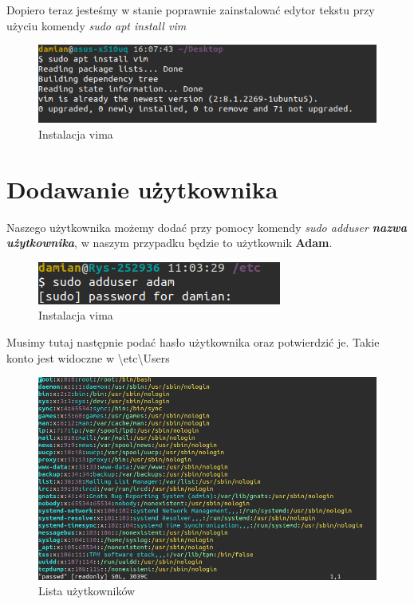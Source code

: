 \documentclass{article}
\begin{document}
Dopiero teraz jesteśmy w stanie poprawnie zainstalować edytor
tekstu przy użyciu komendy \textit{sudo apt install vim}

\begin{figure}[H]
    \centering
    
    \includegraphics[totalheight=3cm]{data/installVim.png}
    \caption{Instalacja vima}
    \label{2}
\end{figure}


\section{Dodawanie użytkownika}
Naszego użytkownika możemy dodać przy pomocy komendy 
\textit{sudo adduser \textbf{nazwa użytkownika}}, w naszym przypadku będzie to 
użytkownik \textbf{Adam}.

\begin{figure}[H]
    \centering
    \includegraphics[totalheight=2cm]{data/userAdd.png}
    \caption{Instalacja vima}
    \label{2}
\end{figure}
Musimy tutaj następnie podać hasło użytkownika oraz potwierdzić je.
Takie konto jest widoczne w  \textbackslash etc\textbackslash Users 

\begin{figure}[H]
    \centering
    \includegraphics[totalheight=7cm]{data/Users.png}
    \caption{Lista użytkowników}
    \label{2}
\end{figure}
\end{document}
